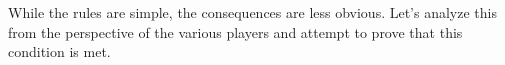 While the rules are simple, the consequences are less obvious. Let's analyze
this from the perspective of the various players and attempt to prove that this
condition is met.
